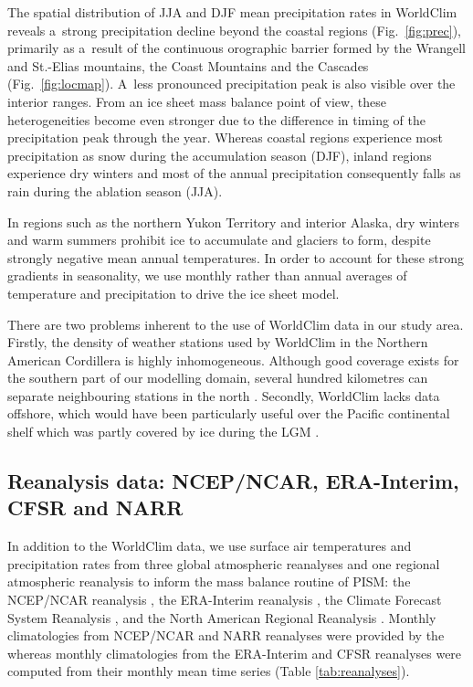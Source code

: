 \documentclass[tc, ms]{copernicus}
\begin{document}
The spatial distribution of JJA and DJF mean precipitation rates in WorldClim reveals a~strong precipitation decline beyond the coastal regions (Fig.~\ref{fig:prec}), primarily as a~result of the continuous orographic barrier formed by the Wrangell and St.-Elias mountains, the Coast Mountains and the Cascades (Fig.~\ref{fig:locmap}). A~less pronounced precipitation peak is also visible over the interior ranges. From an ice sheet mass balance point of view, these heterogeneities become even stronger due to the difference in timing of the precipitation peak through the year. Whereas coastal regions experience most precipitation as snow during the accumulation season (DJF), inland regions experience dry winters and most of the annual precipitation consequently falls as rain during the ablation season (JJA).

In regions such as the northern Yukon Territory and interior Alaska, dry winters and warm summers prohibit ice to accumulate and glaciers to form, despite strongly negative mean annual temperatures. In order to account for these strong gradients in seasonality, we use monthly rather than annual averages of temperature and precipitation to drive the ice sheet model.

There are two problems inherent to the use of WorldClim data in our study area. Firstly, the density of weather stations used by WorldClim in the Northern American Cordillera is highly inhomogeneous. Although good coverage exists for the southern part of our modelling domain, several hundred kilometres can separate neighbouring stations in the north \citep{data:worldclim}. Secondly, WorldClim lacks data offshore, which would have been particularly useful over the Pacific continental shelf which was partly covered by ice during the LGM \citep{jackson-clague-1991}.

\subsection{Reanalysis data: NCEP/NCAR, ERA-Interim, CFSR and NARR}

In addition to the WorldClim data, we use surface air temperatures and precipitation rates from three global atmospheric reanalyses and one regional atmospheric reanalysis to inform the mass balance routine of PISM: the NCEP/NCAR reanalysis \citep{data:ncar}, the ERA-Interim reanalysis \citep{data:erai}, the Climate Forecast System Reanalysis \citep[CFSR;][]{data:cfsr}, and the North American Regional Reanalysis \citep[NARR;][]{data:narr}. Monthly climatologies from NCEP/NCAR and NARR reanalyses were provided by the \citet{web:psd} whereas monthly climatologies from the ERA-Interim and CFSR reanalyses were computed from their monthly mean time series (Table \ref{tab:reanalyses}).
\end{document}
